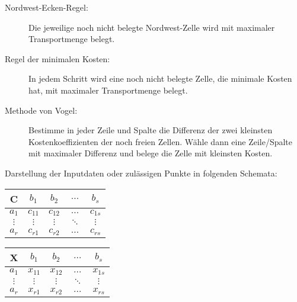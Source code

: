 \begin{description}
	\item[Nordwest-Ecken-Regel:] Die jeweilige noch nicht belegte Nordwest-Zelle wird mit maximaler Transportmenge belegt.
	\item[Regel der minimalen Kosten:] In jedem Schritt wird eine noch nicht belegte Zelle, die minimale Kosten hat, mit maximaler Transportmenge belegt.
	\item[Methode von Vogel:] Bestimme in jeder Zeile und Spalte die Differenz der zwei kleinsten Kostenkoeffizienten der noch freien Zellen. Wähle dann eine Zeile/Spalte mit maximaler Differenz und belege die Zelle mit kleinsten Kosten.
\end{description}

Darstellung der Inputdaten oder zulässigen Punkte in folgenden Schemata:

\begin{minipage}{\dimexpr0.5\linewidth-\fboxrule-\fboxsep}
	\centering
	\begin{tabular}{c|cccc}
		C & $b_1$ & $b_2$ & $\dots$ & $b_s$ \\ \hline
		$a_1$ & $c_{11}$ & $c_{12}$ & $\dots$ & $c_{1s}$ \\
		$\vdots$  & $\vdots$ & $\vdots$ & $\ddots$ & $\vdots$ \\
		$a_r$ & $c_{r1}$ & $c_{r2}$ & $\dots$ & $c_{rs}$
	\end{tabular}
\end{minipage}
\begin{minipage}{\dimexpr0.5\linewidth-\fboxrule-\fboxsep}
	\centering
	\begin{tabular}{c|cccc}
		X & $b_1$ & $b_2$ & $\dots$ & $b_s$ \\ \hline
		$a_1$ & $x_{11}$ & $x_{12}$ & $\dots$ & $x_{1s}$ \\
		$\vdots$  & $\vdots$ & $\vdots$ & $\ddots$ & $\vdots$ \\
		$a_r$ & $x_{r1}$ & $x_{r2}$ & $\dots$ & $x_{rs}$
	\end{tabular}
\end{minipage}




